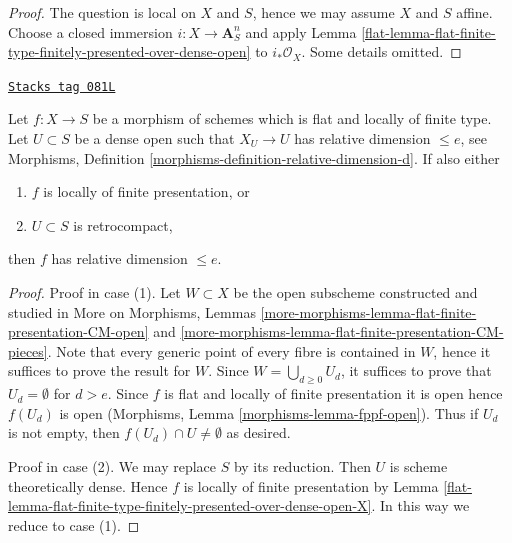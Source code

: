 \begin{proof}

The question is local on $X$ and $S$, hence we may assume $X$ and
$S$ affine. Choose a closed immersion $i : X \to \mathbf{A}^n_S$
and apply
Lemma \ref{flat-lemma-flat-finite-type-finitely-presented-over-dense-open}
to $i_*\mathcal{O}_X$. Some details omitted.
\end{proof}

\begin{lemma}
\label{flat-lemma-flat-finite-presentation-dimension-over-dense-open}
\href{https://stacks.math.columbia.edu/tag/081L}{\texttt{Stacks tag 081L}}

Let $f : X \to S$ be a morphism of schemes which is flat and locally
of finite type. Let $U \subset S$ be a dense open such that
$X_U \to U$ has relative dimension $\leq e$, see
Morphisms, Definition \ref{morphisms-definition-relative-dimension-d}.
If also either
\begin{enumerate}
\item $f$ is locally of finite presentation, or
\item $U \subset S$ is retrocompact,
\end{enumerate}
then $f$ has relative dimension $\leq e$.
\end{lemma}

\begin{proof}

Proof in case (1). Let $W \subset X$ be the open subscheme constructed
and studied in More on Morphisms, Lemmas
\ref{more-morphisms-lemma-flat-finite-presentation-CM-open} and
\ref{more-morphisms-lemma-flat-finite-presentation-CM-pieces}.
Note that every generic point of every fibre is contained in $W$,
hence it suffices to prove the result for $W$. Since
$W = \bigcup_{d \geq 0} U_d$, it suffices to prove that $U_d = \emptyset$
for $d > e$. Since $f$ is flat and locally of finite presentation it is open
hence $f(U_d)$ is open (Morphisms, Lemma \ref{morphisms-lemma-fppf-open}).
Thus if $U_d$ is not empty, then $f(U_d) \cap U \not = \emptyset$ as
desired.

\medskip\noindent
Proof in case (2). We may replace $S$ by its reduction. Then $U$ is
scheme theoretically dense. Hence $f$ is locally of finite presentation
by Lemma \ref{flat-lemma-flat-finite-type-finitely-presented-over-dense-open-X}.
In this way we reduce to case (1).
\end{proof}

